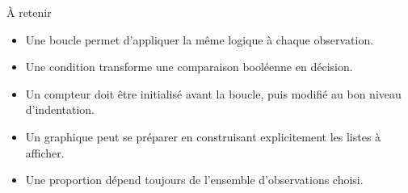 \documentclass[11pt,a4paper]{article}
\begin{document}
\begin{takeawaybox}{À retenir}
\begin{itemize}
  \item Une boucle  permet d'appliquer la même logique à chaque observation.
  \item Une condition transforme une comparaison booléenne en décision.
  \item Un compteur doit être initialisé avant la boucle, puis modifié au bon niveau d'indentation.
  \item Un graphique peut se préparer en construisant explicitement les listes à afficher.
  \item Une proportion dépend toujours de l'ensemble d'observations choisi.
\end{itemize}
\end{takeawaybox}
\end{document}
